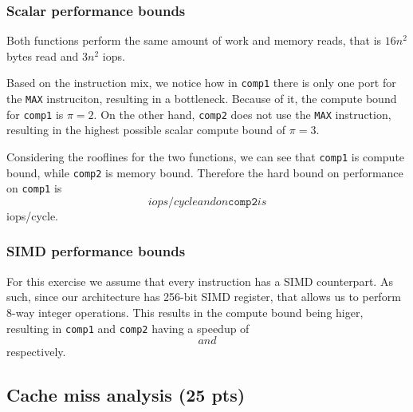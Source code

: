 \subsubsection{Scalar performance bounds}
Both functions perform the same amount of work and memory reads, that is $16n^2$ bytes read and $3n^2$ iops.

Based on the instruction mix, we notice how in \texttt{comp1} there is only one port for the \texttt{MAX} instruciton, resulting in a bottleneck. Because of it, the compute bound for \texttt{comp1} is $\pi=2$. On the other hand, \texttt{comp2} does not use the \texttt{MAX} instruction, resulting in the highest possible scalar compute bound of $\pi=3$.

Considering the rooflines for the two functions, we can see that \texttt{comp1} is compute bound, while \texttt{comp2} is memory bound. Therefore the hard bound on performance on \texttt{comp1} is $$ iops/cycle and on \texttt{comp2} is $$ iops/cycle.

\subsubsection{SIMD performance bounds}
For this exercise we assume that every instruction has a SIMD counterpart. As such, since our architecture has 256-bit SIMD register, that allows us to perform 8-way integer operations. This results in the compute bound being higer, resulting in \texttt{comp1} and \texttt{comp2} having a speedup of $$ and $$ respectively.

\subsection{Cache miss analysis (25 pts)}

